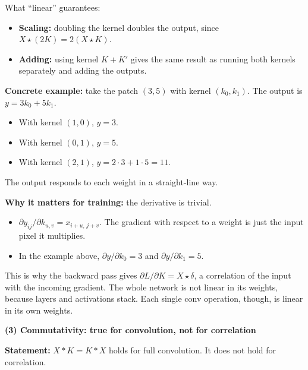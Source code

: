 What ``linear'' guarantees:
\begin{itemize}
  \item \textbf{Scaling:} doubling the kernel doubles the output, since $X \star (2K) = 2(X \star K)$.
  \item \textbf{Adding:} using kernel $K + K'$ gives the same result as running both kernels separately and adding the outputs.
\end{itemize}

\textbf{Concrete example:} take the patch $(3, 5)$ with kernel $(k_0, k_1)$. The output is $y = 3k_0 + 5k_1$.
\begin{itemize}
  \item With kernel $(1, 0)$, $y = 3$.
  \item With kernel $(0, 1)$, $y = 5$.
  \item With kernel $(2, 1)$, $y = 2\cdot 3 + 1\cdot 5 = 11$.
\end{itemize}
The output responds to each weight in a straight-line way.

\textbf{Why it matters for training:} the derivative is trivial.
\begin{itemize}
  \item $\partial y_{ij} / \partial k_{u,v} = x_{i+u,\, j+v}$. The gradient with respect to a weight is just the input pixel it multiplies.
  \item In the example above, $\partial y / \partial k_0 = 3$ and $\partial y / \partial k_1 = 5$.
\end{itemize}
This is why the backward pass gives $\partial L / \partial K = X \star \delta$, a correlation of the input with the incoming gradient. The whole network is not linear in its weights, because layers and activations stack. Each single conv operation, though, is linear in its own weights.

\textbf{(3) Commutativity: true for convolution, not for correlation}

\textbf{Statement:} $X * K = K * X$ holds for full convolution. It does not hold for correlation.

